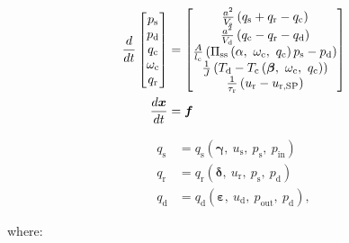 \begin{equation}
  \begin{split}
    \dt{} \begin{bmatrix}
      p_\text{s}\\
      p_\text{d}\\
      q_\text{c}\\
      \omega_\text{c}\\
      q_\text{r}
    \end{bmatrix} & =
    \begin{bmatrix}
      \frac{a^2}{V_\text{s}}\left(q_\text{s}+q_\text{r}-q_\text{c}\right)\\
      \frac{a^2}{V_\text{d}}\left(q_\text{c}-q_\text{r}-q_\text{d}\right)\\
      \frac{A}{l_\text{c}}\left(\Pi_{\text{ss}}\left(\alpha,\ \omega_\text{c},\ q_\text{c} \right)p_\text{s} - p_\text{d}  \right)\\
      \frac{1}{J}\left(T_\text{d} - T_\text{c}\left(\bm{\beta},\ \omega_\text{c},\ q_\text{c}\right)\right)\\
      \frac{1}{\tau_\text{r}}\left(u_\text{r} - u_{\text{r,SP}}\right)
    \end{bmatrix} \\
    \dt{\bm{x}} & = \bm{f}
  \end{split}
  \label{eq:mod:single_comp_states}
\end{equation}

\begin{equation}
  \begin{split}
    q_\text{s} & = q_\text{s}(\bm{\gamma},\ u_{\text{s}},\ p_\text{s},\ p_{\text{in}})\\
    q_\text{r} & = q_\text{r}(\bm{\delta},\ u_\text{r},\ p_\text{s},\ p_\text{d})\\
    q_\text{d} & = q_\text{d}(\bm{\varepsilon},\ u_{\text{d}},\ p_{\text{out}},\ p_\text{d}),
  \end{split}
\end{equation}


where:

